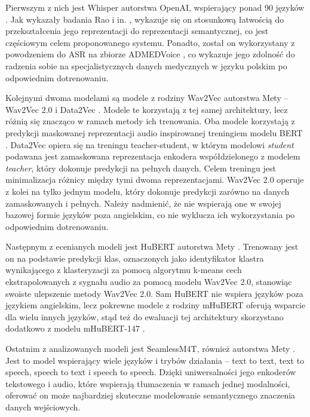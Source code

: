 Pierwszym z nich jest Whisper autorstwa OpenAI, wspierający ponad 90 języków \cite{whisper}. Jak wykazały badania Rao i in. \cite{whispaSemanticAlign}, wykazuje się on stosunkową łatwością do przekształcenia jego reprezentacji do reprezentacji semantycznej, co jest częściowym celem proponowanego systemu. Ponadto, został on wykorzystany z powodzeniem do ASR na zbiorze ADMEDVoice \cite{ADMEDVoice}, co wykazuje jego zdolność do radzenia sobie na specjalistycznych danych medycznych w języku polskim po odpowiednim dotrenowaniu.

Kolejnymi dwoma modelami są modele z rodziny Wav2Vec autorstwa Mety -- Wav2Vec 2.0 \cite{baevski2020wav2vec} i Data2Vec \cite{data2vec}. Modele te korzystają z tej samej architektury, lecz różnią się znacząco w ramach metody ich trenowania. Oba modele korzystają z predykcji maskowanej reprezentacji audio inspirowanej treningiem modelu BERT \cite{devlin2019bert}. Data2Vec opiera się na treningu teacher-student, w którym modelowi \textit{student} podawana jest zamaskowana reprezentacja enkodera współdzielonego z modelem \textit{teacher}, który dokonuje predykcji na pełnych danych. Celem treningu jest minimalizacja różnicy między tymi dwoma reprezentacjami. Wav2Vec 2.0 operuje z kolei na tylko jednym modelu, który dokonuje predykcji zarówno na danych zamaskowanych i pełnych. Należy nadmienić, że nie wspierają one w swojej bazowej formie języków poza angielskim, co nie wyklucza ich wykorzystania po odpowiednim dotrenowaniu.

Następnym z ecenianych modeli jest HuBERT autorstwa Mety \cite{hsu2021hubert}. Trenowany jest on na podstawie predykcji klas, oznaczonych jako identyfikator klastra wynikającego z klasteryzacji za pomocą algorytmu k-means cech ekstrapolowanych z sygnału audio za pomocą modelu Wav2Vec 2.0, stanowiąc swoiste ulepszenie metody Wav2Vec 2.0. Sam HuBERT nie wspiera języków poza językiem angielskim, lecz pokrewne modele z rodziny mHuBERT oferują wsparcie dla wielu innych języków, stąd też do ewaluacji tej architektury skorzystano dodatkowo z modelu mHuBERT-147 \cite{mhubert}.

Ostatnim z analizowanych modeli jest SeamlessM4T, również autorstwa Mety \cite{m4t}. Jest to model wspierający wiele języków i trybów działania -- text to text, text to speech, speech to text i speech to speech. Dzięki uniwersalności jego enkoderów tekstowego i audio, które wspierają tłumaczenia w ramach jednej modalności, oferować on może najbardziej skuteczne modelowanie semantycznego znaczenia danych wejściowych.

